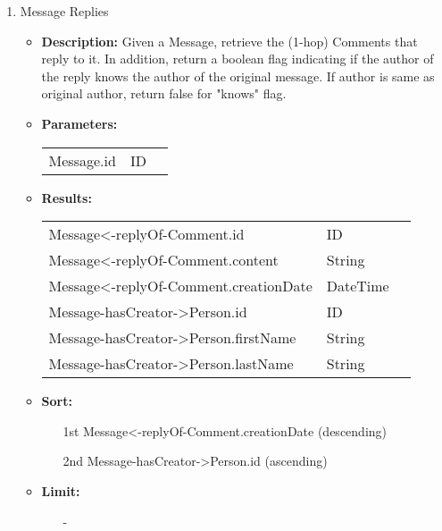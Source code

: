 {\begin{enumerate}
  \item Message Replies
    \begin{itemize}
      \item \textbf{Description:}
        Given a Message, retrieve the (1-hop) Comments that reply to it.
        In addition, return a boolean flag indicating if the author of the reply knows the author of the original message.
        If author is same as original author, return false for "knows" flag.
      \item \textbf{Parameters:} \\
        \begin{tabular}{lll}
          Message.id 										& ID \\
        \end{tabular}
      \item \textbf{Results:} \\
        \begin{tabular}{lll}
          Message<-replyOf-Comment.id                       & ID \\
          Message<-replyOf-Comment.content                       & String \\
          Message<-replyOf-Comment.creationDate                       & DateTime \\
          Message-hasCreator->Person.id     									& ID \\
          Message-hasCreator->Person.firstName    									& String \\
          Message-hasCreator->Person.lastName     									& String \\
        \end{tabular}
      \item \textbf{Sort:}
        \begin{itemize}
          \item[1st] Message<-replyOf-Comment.creationDate (descending)
          \item[2nd] Message-hasCreator->Person.id (ascending)
        \end{itemize}
            \item \textbf{Limit:}
                  \begin{itemize}
                    \item[] -
                  \end{itemize}
    \end{itemize}
\end{enumerate}
}

